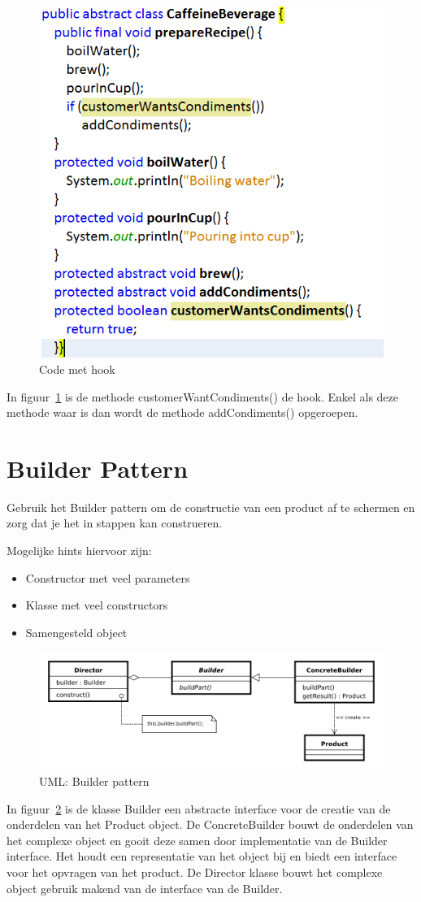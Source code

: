 \documentclass[a4paper,12pt]{article}
\begin{document}
\begin{figure}[H]
\centering
  	\includegraphics[width=.5\linewidth]{img/Template/VoorbeeldHook.png}
  	\caption{Code met hook}
  	\label{fig:VoorbeeldHook}
\end{figure}

In figuur~\ref{fig:VoorbeeldHook} is de methode customerWantCondiments() de hook. Enkel als deze methode waar is dan wordt de methode addCondiments() opgeroepen.

\section{Builder Pattern}
Gebruik het Builder pattern om de constructie van een product af te schermen en zorg dat je het in stappen kan construeren.

Mogelijke hints hiervoor zijn:
\begin{itemize}
\item Constructor met veel parameters
\item Klasse met veel constructors
\item Samengesteld object
\end{itemize}

\begin{figure}[H]
\centering
  	\includegraphics[width=.7\linewidth]{img/Builder/Builder.png}
  	\caption{UML: Builder pattern}
  	\label{fig:Builder}
\end{figure}

In figuur~\ref{fig:Builder} is de klasse Builder een abstracte interface voor de creatie van de onderdelen van het Product object.
De ConcreteBuilder bouwt de onderdelen van het complexe object en gooit deze samen door implementatie van de Builder interface.
Het houdt een representatie van het object bij en biedt een interface voor het opvragen van het product.
De Director klasse bouwt het complexe object gebruik makend van de interface van de Builder.
\end{document}
